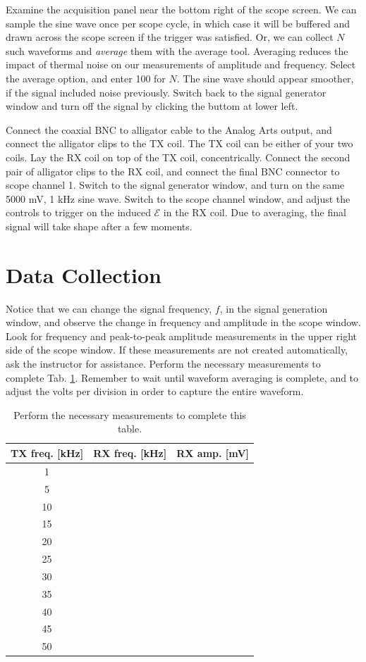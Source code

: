 \documentclass[12pt,twocolumn]{article}
\begin{document}
Examine the acquisition panel near the bottom right of the scope screen.  We can sample the sine wave once per scope cycle, in which case it will be buffered and drawn across the scope screen if the trigger was satisfied.  Or, we can collect $N$ such waveforms and \textit{average} them with the average tool.  Averaging reduces the impact of thermal noise on our measurements of amplitude and frequency.  Select the average option, and enter 100 for $N$.  The sine wave should appear smoother, if the signal included noise previously.  Switch back to the signal generator window and turn off the signal by clicking the buttom at lower left.

Connect the coaxial BNC to alligator cable to the Analog Arts output, and connect the alligator clips to the TX coil.  The TX coil can be either of your two coils.  Lay the RX coil on top of the TX coil, concentrically.  Connect the second pair of alligator clips to the RX coil, and connect the final BNC connector to scope channel 1.  Switch to the signal generator window, and turn on the same 5000 mV, 1 kHz sine wave.  Switch to the scope channel window, and adjust the controls to trigger on the induced $\mathcal{E}$ in the RX coil.  Due to averaging, the final signal will take shape after a few moments.

\section{Data Collection}

Notice that we can change the signal frequency, $f$, in the signal generation window, and observe the change in frequency and amplitude in the scope window.  Look for frequency and peak-to-peak amplitude measurements in the upper right side of the scope window.  If these measurements are not created automatically, ask the instructor for assistance.  Perform the necessary measurements to complete Tab. \ref{tab:data}.  Remember to wait until waveform averaging is complete, and to adjust the volts per division in order to capture the entire waveform.

\begin{table}[ht]
\footnotesize
\begin{tabular}{| c | c | c |}
\hline
\textbf{TX freq.} [kHz] & \textbf{RX freq.} [kHz] & \textbf{RX amp.} [mV] \\ \hline
1 & & \\ \hline
5 & & \\ \hline
10 & & \\ \hline
15 & & \\ \hline
20 & & \\ \hline
25 & & \\ \hline
30 & & \\ \hline
35 & & \\ \hline
40 & & \\ \hline
45 & & \\ \hline
50 & & \\ \hline
\end{tabular}
\caption{\label{tab:data} Perform the necessary measurements to complete this table.}
\end{table}
\end{document}
